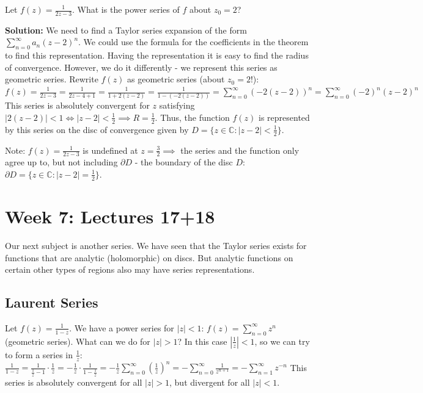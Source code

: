 \documentclass[12pt]{article}
\begin{document}
\begin{example}
Let $f(z) = \frac{1}{2z-3}$. What is the power series of $f$ about $z_0 = 2$?

\textbf{Solution:} We need to find a Taylor series expansion of the form $\sum_{n=0}^\infty a_n(z-2)^n$. We could use the formula for the coefficients in the theorem to find this representation. Having the representation it is easy to find the radius of convergence. However, we do it differently - we represent this series as geometric series.
Rewrite $f(z)$ as geometric series (about $z_0 = 2$!):
$f(z) = \frac{1}{2z-3} = \frac{1}{2z-4+1} = \frac{1}{1+2(z-2)} = \frac{1}{1-(-2(z-2))} = \sum_{n=0}^\infty (-2(z-2))^n = \sum_{n=0}^\infty (-2)^n(z-2)^n$
This series is absolutely convergent for $z$ satisfying $|2(z-2)| < 1 \iff |z-2| < \frac{1}{2} \implies R = \frac{1}{2}$. Thus, the function $f(z)$ is represented by this series on the disc of convergence given by $D = \{z \in \mathbb{C}: |z-2| < \frac{1}{2}\}$.
\end{example}

\begin{remark}
Note: $f(z) = \frac{1}{2z-3}$ is undefined at $z = \frac{3}{2} \implies$ the series and the function only agree up to, but not including $\partial D$ - the boundary of the disc $D$: $\partial D = \{z \in \mathbb{C}: |z-2| = \frac{1}{2}\}$.
\end{remark}

\section{Week 7: Lectures 17+18}

Our next subject is another series. We have seen that the Taylor series exists for functions that are analytic (holomorphic) on discs. But analytic functions on certain other types of regions also may have series representations.

\subsection{Laurent Series}

\begin{example}
Let $f(z) = \frac{1}{1-z}$. We have a power series for $|z| < 1$:
$f(z) = \sum_{n=0}^\infty z^n$ (geometric series). What can we do for $|z| > 1$?
In this case $|\frac{1}{z}| < 1$, so we can try to form a series in $\frac{1}{z}$:
$\frac{1}{1-z} = \frac{1}{\frac{1}{z}-1} \cdot \frac{1}{z} = -\frac{1}{z} \cdot \frac{1}{1-\frac{1}{z}} = -\frac{1}{z} \sum_{n=0}^\infty (\frac{1}{z})^n = -\sum_{n=0}^\infty \frac{1}{z^{n+1}} = -\sum_{n=1}^\infty z^{-n}$
This series is absolutely convergent for all $|z| > 1$, but divergent for all $|z| < 1$.
\end{example}
\end{document}
